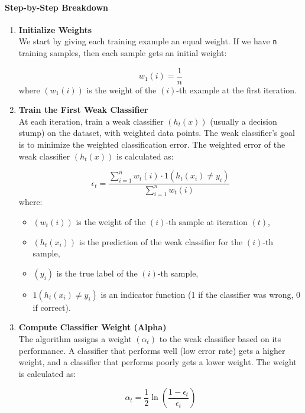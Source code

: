 \documentclass[12pt]{book}
\providecommand{\tightlist}{%
  \setlength{\itemsep}{0pt}\setlength{\parskip}{0pt}}
\begin{document}
\paragraph{Step-by-Step Breakdown}\label{step-by-step-breakdown}

\begin{enumerate}
\def\labelenumi{\arabic{enumi}.}
\item
  \textbf{Initialize Weights}\\
  We start by giving each training example an equal weight. If we have
  \texttt{n} training samples, then each sample gets an initial weight:

  \[
  w_1(i) = \frac{1}{n}
  \] where \(( w_1(i) )\) is the weight of the \((i)\)-th example at the
  first iteration.
\item
  \textbf{Train the First Weak Classifier}\\
  At each iteration, train a weak classifier \((h_t(x))\) (usually a
  decision stump) on the dataset, with weighted data points. The weak
  classifier's goal is to minimize the weighted classification error.
  The weighted error of the weak classifier \((h_t(x))\) is calculated
  as:

  \[
  \epsilon_t = \frac{\sum_{i=1}^{n} {w_t(i) \cdot {1}(h_t(x_i) \neq y_i)}}{\sum_{i=1}^{n} w_t(i)}
  \] where:

  \begin{itemize}
  \tightlist
  \item
    \(( w_t(i) )\) is the weight of the \((i)\)-th sample at iteration
    \((t)\),
  \item
    \(( h_t(x_i) )\) is the prediction of the weak classifier for the
    \((i)\)-th sample,
  \item
    \(( y_i )\) is the true label of the \((i)\)-th sample,
  \item
    \( {1}(h_t(x_i) \neq y_i) \) is an indicator function (1 if
    the classifier was wrong, 0 if correct).
  \end{itemize}
\item
  \textbf{Compute Classifier Weight (Alpha)}\\
  The algorithm assigns a weight \(( \alpha_t )\) to the weak classifier
  based on its performance. A classifier that performs well (low error
  rate) gets a higher weight, and a classifier that performs poorly gets
  a lower weight. The weight is calculated as:

  \[
  \alpha_t = \frac{1}{2} \ln\left(\frac{1 - \epsilon_t}{\epsilon_t}\right)
  \]


\end{enumerate}
\end{document}
